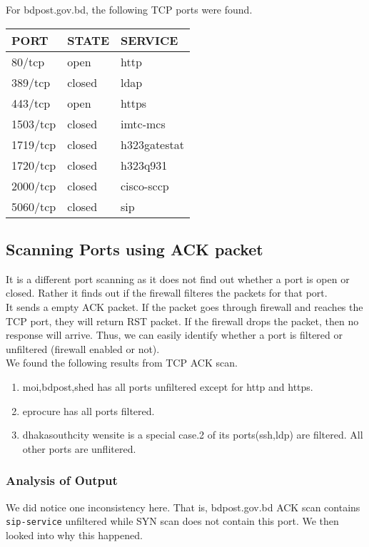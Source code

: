 \documentclass[11pt]{article}
\begin{document}
For bdpost.gov.bd, the following TCP ports were found.\\
\begin{center}
\begin{tabular}{lll}
PORT & STATE & SERVICE\\
\hline
80/tcp & open & http\\
389/tcp & closed & ldap\\
443/tcp & open & https\\
1503/tcp & closed & imtc-mcs\\
1719/tcp & closed & h323gatestat\\
1720/tcp & closed & h323q931\\
2000/tcp & closed & cisco-sccp\\
5060/tcp & closed & sip\\
\end{tabular}
\end{center}

\subsection{Scanning Ports using ACK packet}
\label{sec:orgcaa018b}
It is a different port scanning as it does not find out whether a port is open or closed. Rather it finds out if the firewall filteres the packets for that port.\\
It sends a empty ACK packet. If the packet goes through firewall and reaches the TCP port, they will return RST packet. If the firewall drops the packet, then no response will arrive. Thus, we can easily identify whether a port is filtered or unfiltered (firewall enabled or not).\\

We found the following results from TCP ACK scan.\\
\begin{enumerate}
\item moi,bdpost,shed has all ports unfiltered except for http and https.\\
\item eprocure has all ports filtered.\\
\item dhakasouthcity wensite is a special case.2 of its ports(ssh,ldp) are filtered. All other ports are unflitered.\\
\end{enumerate}

\subsubsection{Analysis of Output}
\label{sec:org28d4705}
We did notice one inconsistency here. That is, bdpost.gov.bd ACK scan contains \texttt{sip-service} unfiltered while SYN scan does not contain this port. We then looked into why this happened.\\
\end{document}
